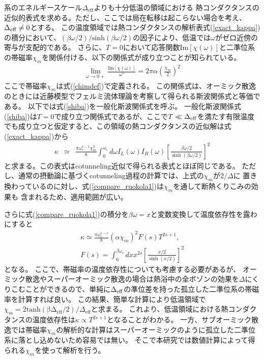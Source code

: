 系のエネルギースケール$\Delta_{\mathrm{eff}}$よりも十分低温の領域における
熱コンダクタンスの近似的表式を求める。ただし、ここでは局在転移は起こらない場合を考え、$\Delta_{\rm eff}\neq0$とする。
この温度領域では熱コンダクタンスの解析表式(\ref{exact_kappa})の積分において、$(\beta\omega/2)/\mathrm{sinh}(\beta\omega/2)$の因子により、低温では$\omega$がゼロ近傍の寄与が支配的である。
さらに、$T=0$において応答関数$\mathrm{Im}[\chi(\omega)]$と二準位系の帯磁率$\chi_m$を関係付ける、以下の関係式が成り立つことが知られている\cite{Sassetti90}。
\begin{eqnarray}
	 \lim_{\omega \to 0+} \frac{\mathrm{Im}[\chi(\omega)]}{\omega^{s}}=2\pi\alpha\left(\frac{\chi_m}{2}\right)^{2}
	 \label{shiba}
\end{eqnarray}
ここで帯磁率$\chi_m$は式(\ref{chimdef})で定義される。
この関係式は、オーミック散逸のときには近藤模型でフェルミ流体理論を考察して得られる斯波関係式\cite{Shiba75,Tsvelick83,Okiji87}と等価である。
以下では式(\ref{shiba})を一般化斯波関係式を呼ぶ。
一般化斯波関係式(\ref{shiba})は$T=0$で成り立つ関係式であるが、ここで$T\ll\Delta_{\rm{eff}}$を満たす有限温度でも成り立つと仮定すると、この領域の熱コンダクタンスの近似解は式(\ref{exact_kappa})から
\begin{eqnarray}
	\kappa&\simeq& \frac{\pi\omega_c^{s-1}\chi_m^2}{8}\int_{0}^{\omega_{c}}d\omega  I_L(\omega)I_R (\omega)\left[\frac{\beta\omega/2}{\sinh{(\beta\omega/2)}}\right]^{2}
	\label{compare_ruokola1}
\end{eqnarray}
と求まる。この表式はcotunneling近似で得られる表式とほぼ同じである\cite{Ruokola11}。
ただし、通常の摂動論に基づくcotunneling過程の計算では、上式の$\chi_m$が$2/\Delta$に
置き換わっているのに対し、式(\ref{compare_ruokola1})は$\chi_m$を通して断熱くりこみの効果も
含まれるため、適用範囲が広い。

さらに式(\ref{compare_ruokola1})の積分を$\beta\omega=x$と変数変換して温度依存性を露わにすると
\begin{eqnarray}
	\kappa\simeq \frac{\pi\omega_c^{1-s}}{8}\left( \alpha \chi_m \right)^2 F(s)T^{2s+1}
	\label{cond_lowtemp},\\
	F (s)=\int_{0}^{\beta\omega_{c}}dx  x^{2s}\left[\frac{x/2}{\sinh({x/2})}\right]^{2}
\end{eqnarray}
となる。
ここで、帯磁率の温度依存性についても考慮する必要があるが、
オーミック散逸やスーパーオーミック散逸の場合は熱浴中の全ボゾンの効果を$\Delta$にくりこむことができるので、単純に$\Delta_{\rm eff}$の準位差を持った孤立した二準位系の帯磁率を計算すれば良い。
この結果、簡単な計算により低温領域で$\chi_m=2\mathrm{tanh(\beta\Delta_{\mathrm{eff}}/2)}/\Delta_{\mathrm{eff}}$と求まる。
これより、低温領域における熱コンダクタンスの温度依存性は$\kappa\propto T^{2s+1}$となることがわかる。
一方、サブオーミック散逸では帯磁率$\chi_m$の解析的な計算はスーパーオーミックのように孤立した二準位系に落とし込めないため容易では無い。
そこで本研究では数値計算によって得られる$\chi_m$を使って解析を行う。

